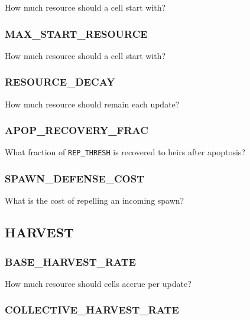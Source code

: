 
How much resource should a cell start with?

\subsubsection{MAX\_START\_RESOURCE}


How much resource should a cell start with?

\subsubsection{RESOURCE\_DECAY}


How much resource should remain each update?

\subsubsection{APOP\_RECOVERY\_FRAC}


What fraction of \texttt{REP\_THRESH} is recovered to heirs after apoptosis?

\subsubsection{SPAWN\_DEFENSE\_COST}


What is the cost of repelling an incoming spawn?


\subsection{HARVEST}


\subsubsection{BASE\_HARVEST\_RATE}


How much resource should cells accrue per update?

\subsubsection{COLLECTIVE\_HARVEST\_RATE}

